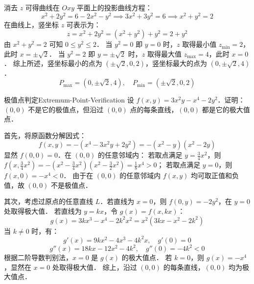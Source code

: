 \begin{solution}
    消去 $z$ 可得曲线在 $Oxy$ 平面上的投影曲线方程：
    \begin{equation}
        x^2 + 2y^2 = 6 - 2x^2 - y^2 \implies 3x^2 + 3y^2 = 6 \implies x^2 + y^2 = 2
    \end{equation}
    在曲线上，竖坐标 $z$ 可表示为：
    \begin{equation}
        z = x^2 + 2y^2 = (x^2 + y^2) + y^2 = 2 + y^2
    \end{equation}
    由 $x^2 + y^2 = 2$ 可知 $0 \le y^2 \le 2$．
    当 $y^2 = 0$ 即 $y = 0$ 时，$z$ 取得最小值 $z_{\min} = 2$，此时 $x = \pm\sqrt{2}$．
    当 $y^2 = 2$ 即 $y = \pm\sqrt{2}$ 时，$z$ 取得最大值 $z_{\max} = 4$，此时 $x = 0$．
    综上所述，竖坐标最小的点为 $(\pm\sqrt{2}, 0, 2)$，竖坐标最大的点为 $(0, \pm\sqrt{2}, 4)$．
    \begin{equation}
        \boxed{P_{\max} = (0, \pm\sqrt{2}, 4), \quad P_{\min} = (\pm\sqrt{2}, 0, 2)}
    \end{equation}
\end{solution}

\begin{problem}{极值点判定}{Extremum-Point-Verification}
    设 $f(x, y) = 3x^2y - x^4 - 2y^2$．证明：$(0, 0)$ 不是它的极值点，但沿过 $(0, 0)$ 点的每条直线，$(0, 0)$ 都是它的极大值点．
\end{problem}

\begin{myproof}
    首先，将原函数分解因式：
    \begin{equation}
        f(x, y) = -(x^4 - 3x^2y + 2y^2) = -(x^2 - y)(x^2 - 2y)
    \end{equation}
    显然 $f(0, 0) = 0$．在 $(0, 0)$ 的任意邻域内：
    若取点满足 $y = \frac{3}{4}x^2$，则 $f(x, \frac{3}{4}x^2) = -(x^2 - \frac{3}{4}x^2)(x^2 - \frac{3}{2}x^2) = \frac{1}{8}x^4 > 0$；
    若取点满足 $y = 0$，则 $f(x, 0) = -x^4 < 0$．
    由于在 $(0, 0)$ 的任意邻域内 $f(x, y)$ 均可取正值和负值，故 $(0, 0)$ 不是极值点．

    其次，考虑过原点的任意直线 $L$．若直线为 $x = 0$，则 $f(0, y) = -2y^2$，在 $y = 0$ 处取得极大值．
    若直线为 $y = kx$，令 $g(x) = f(x, kx)$：
    \begin{equation}
        g(x) = 3kx^3 - x^4 - 2k^2x^2 = x^2(3kx - x^2 - 2k^2)
    \end{equation}
    当 $k \neq 0$ 时，有：
    \begin{equation}
        g'(x) = 9kx^2 - 4x^3 - 4k^2x, \quad g'(0) = 0
    \end{equation}
    \begin{equation}
        g''(x) = 18kx - 12x^2 - 4k^2, \quad g''(0) = -4k^2 < 0
    \end{equation}
    根据二阶导数判别法，$x = 0$ 是 $g(x)$ 的极大值点．
    若 $k = 0$，则 $g(x) = -x^4$，显然在 $x = 0$ 处取得极大值．
    综上，沿过 $(0, 0)$ 的每条直线，$(0, 0)$ 均为极大值点．
\end{myproof}


